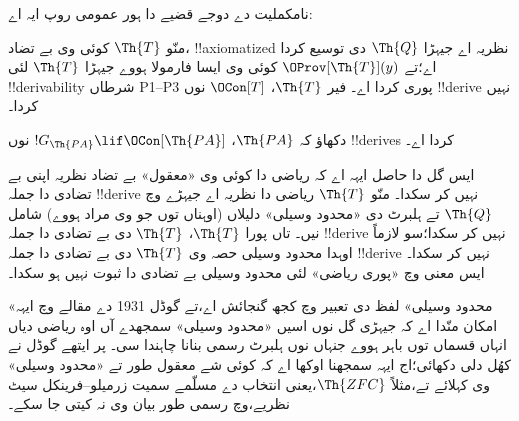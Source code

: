 \documentclass[../../../include/open-logic-section]{subfiles}
\begin{document}
نامکملیت دے دوجے قضیے دا ہور عمومی روپ ایہ اے:

\begin{thm}
 منّو $\Th{T}$ کوئی وی
بے تضاد، !!{axiomatized} نظریہ اے جیہڑا $\Th{Q}$ دی توسیع
کردا اے؛تے $\OProv[\Th{T}](y)$ کوئی وی ایسا فارمولا ہووے
جیہڑا $\Th{T}$ لئی !!{derivability} شرطاں P1--P3 پوری کردا
اے۔ فیر $\Th{T}$، $\OCon[T]$ نوں !!{derive} نہیں کردا۔
\end{thm}

\begin{prob}
دکھاؤ کہ $\Th{PA}$، $!G_{\Th{PA}} \lif \OCon[\Th{PA}]$
نوں !!{derive}s کردا اے۔
\end{prob}

\begin{digress}
ایس گل دا حاصل ایہہ اے کہ ریاضی دا کوئی وی «معقول» بے تضاد
نظریہ اپنی بے تضادی دا جملہ !!{derive} نہیں کر سکدا۔ منّو
$\Th{T}$ ریاضی دا نظریہ اے جیہڑے وچ $\Th{Q}$ تے ہلبرٹ
دی «محدود وسیلی» دلیلاں (اوہناں توں جو وی مراد ہووے) شامل نیں۔
تاں پورا $\Th{T}$، $\Th{T}$ دی بے تضادی دا جملہ
!!{derive} نہیں کر سکدا؛سو لازماً اوہدا محدود
وسیلی حصہ وی $\Th{T}$ دی بے تضادی دا جملہ !!{derive} نہیں
کر سکدا۔ ایس معنی وچ «پوری ریاضی» لئی محدود وسیلی بے تضادی
دا ثبوت نہیں ہو سکدا۔

«محدود وسیلی» لفظ دی تعبیر وچ کجھ گنجائش اے،تے گوڈل
1931 دے مقالے وچ ایہہ امکان منّدا اے کہ جیہڑی گل نوں اسیں
«محدود وسیلی» سمجھدے آں اوہ ریاضی دیاں انہاں قسماں توں باہر
ہووے جنہاں نوں ہلبرٹ رسمی بنانا چاہندا سی۔ پر ایتھے گوڈل
نے کھُل دلی دکھائی؛اج ایہہ سمجھنا اوکھا اے کہ کوئی شے معقول
طور تے «محدود وسیلی» وی کہلائے تے،مثلاً $\Th{ZFC}$،یعنی
انتخاب دے مسلّمے سمیت زرمیلو--فرینکل سیٹ نظریے،وچ رسمی طور
بیان وی نہ کیتی جا سکے۔
\end{digress}
\end{document}
